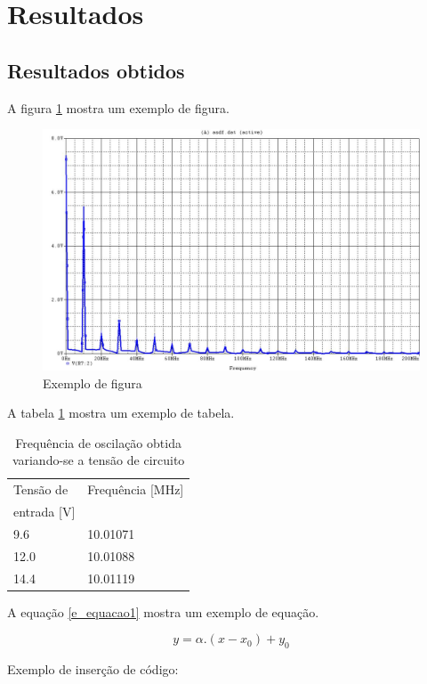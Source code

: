 \newpage
\section{Resultados}

\subsection{Resultados obtidos}

A figura \ref{f_img1} mostra um exemplo de figura.

\begin{figure}[H]
	\centering
	\includegraphics[scale=0.3]{img/img1.jpg}
	\caption{Exemplo de figura}
	\label{f_img1}
\end{figure}

A tabela \ref{t_tabela1} mostra um exemplo de tabela.

\begin{small}
	\begin{table}[H]
		\begin{center}
			\caption{Frequência de oscilação obtida variando-se a tensão de circuito}
			\begin{tabular}{l|l}
				\hline
				Tensão de & Frequência [MHz] \\
				entrada [V]&  \\
				\hline
				9.6 & 10.01071 \\
				\hline
				12.0 & 10.01088 \\
				\hline
				14.4 & 10.01119 \\
				\hline
			\end{tabular}
			\label{t_tabela1}
		\end{center}
	\end{table}
\end{small}

A equação \ref{e_equacao1} mostra um exemplo de equação.

\begin{equation}
y = \alpha.(x-x_0) + y_0
\label{e_equacao1}
\end{equation}

Exemplo de inserção de código:

